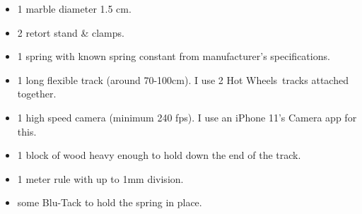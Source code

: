 \begin{itemize}
    \item 1 marble diameter 1.5 cm.
    \item 2 retort stand \& clamps.
    \item 1 spring with known spring constant from manufacturer's specifications.
    \item 1 long flexible track (around 70-100cm). I use 2 Hot Wheels\textregistered~tracks attached together.
    \item 1 high speed camera (minimum 240 fps). I use an iPhone 11's Camera app for this.
    \item 1 block of wood heavy enough to hold down the end of the track.
    \item 1 meter rule with up to 1mm division.
    \item some Blu-Tack to hold the spring in place.
\end{itemize}